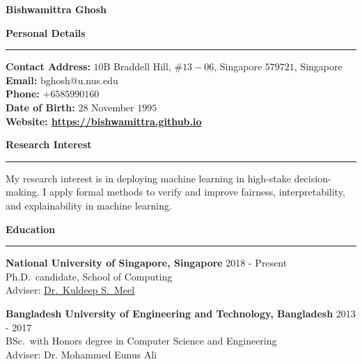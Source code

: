 \documentclass[a4paper,10pt,final]{article}
\newcommand{\Sep}{\vspace{1.5em}}
\newcommand{\SmallSep}{\vspace{0.5em}}
\newcommand{\blue}[1]{\textcolor{blue}{#1}}
\begin{document}
	
	\begin{center}
		\Huge \textbf{Bishwamittra Ghosh}\\
		\vspace{0.2em}	
	\end{center}
	
	\Sep
	\Large { \textbf{Personal Details}}\\
	\noindent\rule{\textwidth}{1pt}
	\normalsize 
	 \textbf{Contact Address:} $ 10 $B Braddell Hill, $ \#13-06 $, Singapore $ 579721 $, Singapore\\
	\textbf{Email:} bghosh@u.nus.edu  \\
	\textbf{Phone:} $ +65 85990160 $\\
	\textbf{Date of Birth:}  $ 28 $  November  $ 1995 $ \\
	\textbf{Website: \blue{\url{https://bishwamittra.github.io}}} 

	\Sep	
\Large { \textbf{Research Interest}}\\
\noindent\rule{\textwidth}{1pt}
\normalsize
My research interest is in deploying machine learning in high-stake decision-making. I apply formal methods to verify and improve fairness, interpretability, and explainability in machine learning. 
	
	\Sep	
\Large { \textbf{Education}}\\
\noindent\rule{\textwidth}{1pt}
\normalsize
\textbf{National University of Singapore, Singapore}
\hspace*{\fill} 2018  - Present\\
Ph.D.\ candidate, School of Computing\\
Adviser: \href{https://www.comp.nus.edu.sg/~meel/}{Dr.\ Kuldeep S.\ Meel}

\SmallSep
\textbf{Bangladesh University of Engineering and Technology, Bangladesh}
\hspace*{\fill} 2013  -  2017\\
BSc.\ with Honors degree in Computer Science and Engineering\\
Adviser: Dr. Mohammed Eunus Ali
\end{document}
